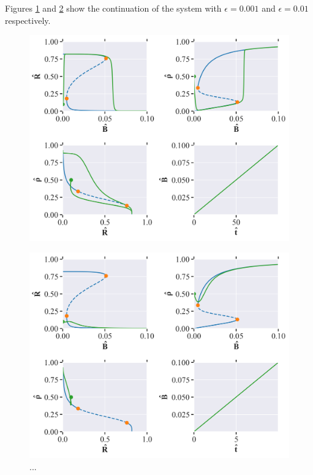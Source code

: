 Figures \ref{fig:cell_biology_ex3_small} and \ref{fig:cell_biology_ex3_big} show the continuation of the system with $\epsilon = 0.001$ and $\epsilon = 0.01$ respectively.
\begin{figure}[H]
    \centering
    \includegraphics[width= \textwidth]{figures/cell_biology_R(0)=0.1_rho(0)=0.5_B(0)_0.0001_eps=0.001_Bmax=0.04.png}
    \caption{}
    \label{fig:cell_biology_ex3_small}
\end{figure}

\begin{figure}[H]
    \centering
    \includegraphics[width= \textwidth]{figures/cell_biology_R(0)=0.1_rho(0)=0.5_B(0)_0.0001_eps=0.01_Bmax=0.04.png}
    \caption{...}
    \label{fig:cell_biology_ex3_big}
\end{figure}

